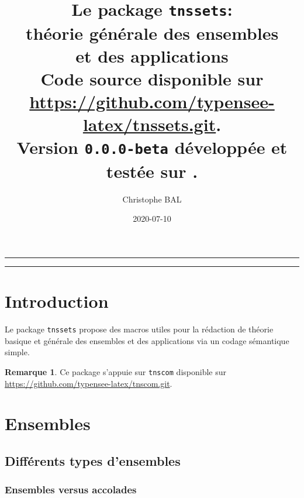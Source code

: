 \documentclass[12pt,a4paper]{article}
\theoremstyle{definition}
\newtheorem*{remark}{Remarque}
\begin{document}
\renewcommand\labelitemi{\raisebox{0.125em}{\tiny\textbullet}}
\renewcommand{\labelitemii}{---}

\title{  %
	Le package \texttt{tnssets}:\\%
	théorie générale des ensembles\\%
	et des applications\\%
	{\footnotesize Code source disponible sur \url{https://github.com/typensee-latex/tnssets.git}.}\\%
{\footnotesize Version \texttt{0.0.0-beta} développée et testée sur \macosxname{}.}%
}
\author{Christophe BAL}
\date{2020-07-10}

\maketitle


\vspace{2em}

\hrule

\tableofcontents

\vspace{1.5em}

\hrule

\newpage

\section{Introduction}

Le package \verb+tnssets+ propose des macros utiles pour la rédaction de théorie basique et générale des ensembles et des applications via un codage sémantique simple.

\begin{remark}
	Ce package s'appuie sur \verb+tnscom+ disponible sur \url{https://github.com/typensee-latex/tnscom.git}.
\end{remark}
\section{Ensembles}

\subsection{Différents types d'ensembles}

\subsubsection{Ensembles versus accolades}
\end{document}
